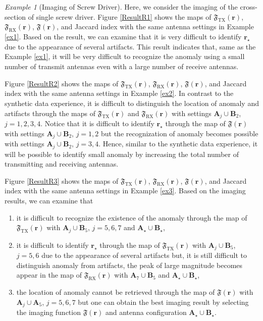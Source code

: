 \documentclass[3p,10pt]{elsarticle}
\newcommand{\mr}{\mathbf{r}}
\DeclareMathOperator*{\tx}{TX}
\DeclareMathOperator*{\rx}{RX}
\theoremstyle{plain}
\theoremstyle{remark}
\newtheorem{example}{Example}[section]
\begin{document}
\begin{example}[Imaging of Screw Driver]\label{exR1}
Here, we consider the imaging of the cross-section of single screw driver. Figure \ref{ResultR1} shows the maps of $\mathfrak{F}_{\tx}(\mr)$, $\mathfrak{F}_{\rx}(\mr)$, $\mathfrak{F}(\mr)$, and Jaccard index with the same antenna settings in Example \ref{ex1}. Based on the result, we can examine that it is very difficult to identify $\mr_\star$ due to the appearance of several artifacts. This result indicates that, same as the Example \ref{ex1}, it will be very difficult to recognize the anomaly using a small number of transmit antennas even with a large number of receive antennas.

Figure \ref{ResultR2} shows the maps of $\mathfrak{F}_{\tx}(\mr)$, $\mathfrak{F}_{\rx}(\mr)$, $\mathfrak{F}(\mr)$, and Jaccard index with the same antenna settings in Example \ref{ex2}. In contrast to the synthetic data experience, it is difficult to distinguish the location of anomaly and artifacts through the maps of $\mathfrak{F}_{\tx}(\mr)$ and $\mathfrak{F}_{\rx}(\mr)$ with settings $\mathbf{A}_j\cup\mathbf{B}_2$, $j=1,2,3,4$. Notice that it is difficult to identify $\mr_\star$ through the map of $\mathfrak{F}(\mr)$ with settings $\mathbf{A}_j\cup\mathbf{B}_2$, $j=1,2$ but the recognization of anomaly becomes possible with settings $\mathbf{A}_j\cup\mathbf{B}_2$, $j=3,4$. Hence, similar to the synthetic data experience, it will be possible to identify small anomaly by increasing the total number of transmitting and receiving antennas.

Figure \ref{ResultR3} shows the maps of $\mathfrak{F}_{\tx}(\mr)$, $\mathfrak{F}_{\rx}(\mr)$, $\mathfrak{F}(\mr)$, and Jaccard index with the same antenna settings in Example \ref{ex3}. Based on the imaging results, we can examine that
\begin{enumerate}
\item[\textcircled{1}] it is difficult to recognize the existence of the anomaly through the map of $\mathfrak{F}_{\tx}(\mr)$ with $\mathbf{A}_j\cup\mathbf{B}_5$, $j=5,6,7$ and $\mathbf{A}_\star\cup\mathbf{B}_\star$,
\item[\textcircled{2}] it is difficult to identify $\mr_\star$ through the map of $\mathfrak{F}_{\tx}(\mr)$ with $\mathbf{A}_j\cup\mathbf{B}_5$, $j=5,6$ due to the appearance of several artifacts but, it is still difficult to distinguish anomaly from artifacts, the peak of large magnitude becomes appear in the map of $\mathfrak{F}_{\rx}(\mr)$ with $\mathbf{A}_7\cup\mathbf{B}_5$ and $\mathbf{A}_\star\cup\mathbf{B}_\star$,
\item[\textcircled{3}] the location of anomaly cannot be retrieved through the map of $\mathfrak{F}(\mr)$ with $\mathbf{A}_j\cup\mathbf{A}_5$, $j=5,6,7$ but one can obtain the best imaging result by selecting the imaging function $\mathfrak{F}(\mr)$ and antenna configuration $\mathbf{A}_\star\cup\mathbf{B}_\star$.
\end{enumerate}
\end{example}
\end{document}

